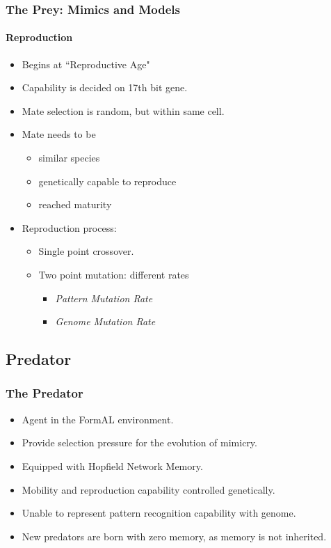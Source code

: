 \frame
{
	\frametitle{The Prey: Mimics and Models}
	\framesubtitle{Reproduction}
	
	\begin{itemize}
		\item Begins at ``Reproductive Age"
		\item Capability is decided on 17th bit gene.
		\item Mate selection is random, but within same cell.
		\item Mate needs to be
			\begin{itemize}
				\item similar species
				\item genetically capable to reproduce
				\item reached maturity 
			\end{itemize}
		\item Reproduction process:
			\begin{itemize}
				\item Single point crossover.
				\item Two point mutation: different rates
					\begin{itemize}
						\item \textit{Pattern Mutation Rate}
						\item \textit{Genome Mutation Rate}
					\end{itemize}
			\end{itemize}
	\end{itemize}
}

\subsection{Predator}

\frame
{
	\frametitle{The Predator}
	
	\begin{itemize}
		\item Agent in the FormAL environment.
		\item Provide selection pressure for the evolution of mimicry.
		\item Equipped with Hopfield Network Memory.
		\item Mobility and reproduction capability controlled genetically.
		\item Unable to represent pattern recognition capability with genome.
		\item New predators are born with zero memory, as memory is not inherited.
	\end{itemize}
}

